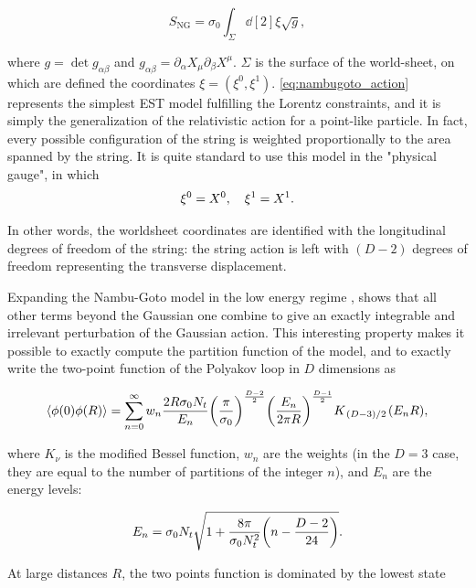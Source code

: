 \documentclass[reqno,12pt]{article}
\numberwithin{equation}{section}
\begin{document}
\begin{equation} \label{eq:nambugoto_action}
	S_\text{NG} = \sigma_0 \int_\Sigma \dd[2]\xi \sqrt{g},
\end{equation}

where $g = \det g_{\alpha\beta}$ and $g_{\alpha\beta} = \partial_\alpha X_\mu \partial_\beta X^\mu$. $\Sigma$ is the surface of the
world-sheet, on which are defined the coordinates $\xi = (\xi^0, \xi^1)$. \eqref{eq:nambugoto_action} represents the 
simplest EST model fulfilling the Lorentz constraints, and it is simply the generalization of the relativistic
action for a point-like particle.
In fact, every possible configuration of the string is weighted proportionally to the area spanned by
the string. It is quite standard to use this model in the "physical gauge", in which 
\begin{equation}
	\xi^0 = X^0 \qc \xi^1 = X^1.
\end{equation} 

In other words, the worldsheet coordinates are identified with the longitudinal degrees of freedom of the string: the string action is left with
$(D-2)$ degrees of freedom representing the transverse displacement. 

Expanding the Nambu-Goto model in the low energy regime \cite{caselle}, shows that all other terms
beyond the Gaussian one combine to give an exactly integrable and irrelevant perturbation of the Gaussian action.
This interesting property makes it possible to exactly compute the partition function of the model, and to exactly write the two-point
function of the Polyakov loop in $D$ dimensions as

\begin{equation} \label{eq:polyloop_expansion}
	\expval{\phi(0) \phi(R)} = 
	\sum_{n=0}^{\infty} w_n \frac{2R\sigma_0N_t}{E_n} \qty(\frac{\pi}{\sigma_0})^{\frac{D-2}{2}} 
	\qty(\frac{E_n}{2\pi R})^{\frac{D-1}{2}} K_{\flatfrac{(D-3)}{2}}(E_n R),
\end{equation}

where $K_\nu$ is the modified Bessel function, $w_n$ are the weights (in the $D=3$ case, they are equal to the number of partitions
of the integer $n$), and $E_n$ are the energy levels:

\begin{equation}
	E_n = \sigma_0 N_t \sqrt{1 + \frac{8\pi}{\sigma_0 N_t^2}\qty(n - \frac{D-2}{24})}.
\end{equation}

At large distances $R$, the two points function is dominated by the lowest state
\end{document}
